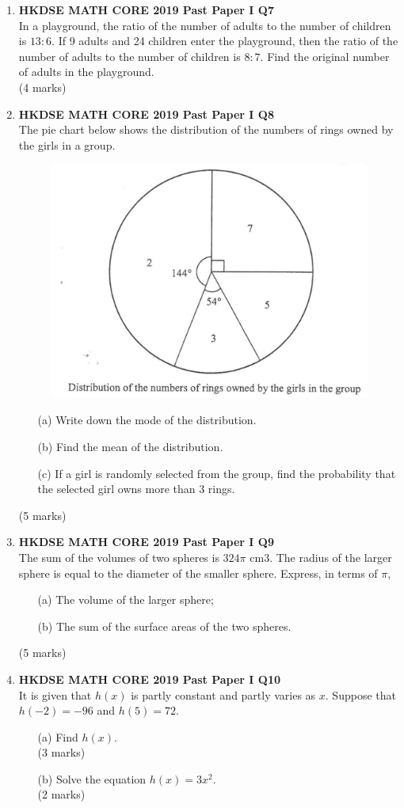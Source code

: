 \documentclass[12pt]{article}
\begin{document}
\begin{enumerate}
	\item \textbf{HKDSE MATH CORE 2019 Past Paper I Q7}\\
	In a playground, the ratio of the number of adults to the number of children is $13 : 6$. If 9 adults and 24 children enter the playground, then the ratio of the number of adults to the number of children is $8 : 7$. Find the original number of adults in the playground. \\(4 marks)
	
	
	\item \textbf{HKDSE MATH CORE 2019 Past Paper I Q8}\\
	The pie chart below shows the distribution of the numbers of rings owned by the girls in a group.
	\begin{figure}[H]
		\centering
		\includegraphics[width = .3\linewidth]{2019Figure1.00}
	\end{figure}
	\begin{enumerate}
		\item[(a)] Write down the mode of the distribution.
		\item[(b)] Find the mean of the distribution.
		\item[(c)] If a girl is randomly selected from the group, find the probability that the selected girl owns more than 3 rings.
	\end{enumerate}
	(5 marks)
	
	\item \textbf{HKDSE MATH CORE 2019 Past Paper I Q9}\\
	The sum of the volumes of two spheres is $324\pi$ cm3. The radius of the larger sphere is equal to the diameter of the smaller sphere. Express, in terms of $\pi$,
	\begin{enumerate}
		\item[(a)] The volume of the larger sphere;
		\item[(b)] The sum of the surface areas of the two spheres.
	\end{enumerate}
	(5 marks)

	\item \textbf{HKDSE MATH CORE 2019 Past Paper I Q10}\\
	It is given that $h(x)$ is partly constant and partly varies as $x$. Suppose that $h(-2) = -96$ and $h(5) = 72$.
	\begin{enumerate}
		\item[(a)] Find $h(x)$. \\(3 marks)
		\item[(b)] Solve the equation $h(x) = 3x^2$. \\(2 marks)
	\end{enumerate}


\end{enumerate}
\end{document}
